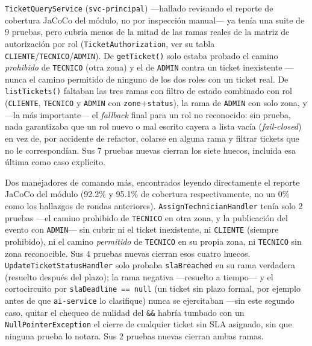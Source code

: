 \texttt{TicketQueryService} (\texttt{svc-principal}) —hallado revisando el reporte de cobertura
JaCoCo del módulo, no por inspección manual— ya tenía una suite de 9 pruebas, pero cubría menos
de la mitad de las ramas reales de la matriz de autorización por rol
(\texttt{TicketAuthorization}, ver su tabla \texttt{CLIENTE}/\texttt{TECNICO}/\texttt{ADMIN}).
De \texttt{getTicket()} solo estaba probado el camino \emph{prohibido} de \texttt{TECNICO} (otra
zona) y el de \texttt{ADMIN} contra un ticket inexistente —nunca el camino permitido de ninguno
de los dos roles con un ticket real. De \texttt{listTickets()} faltaban las tres ramas con filtro
de estado combinado con rol (\texttt{CLIENTE}, \texttt{TECNICO} y \texttt{ADMIN} con
\texttt{zone}+\texttt{status}), la rama de \texttt{ADMIN} con solo zona, y —la más importante— el
\emph{fallback} final para un rol no reconocido: sin prueba, nada garantizaba que un rol nuevo o
mal escrito cayera a lista vacía (\emph{fail-closed}) en vez de, por accidente de refactor,
colarse en alguna rama y filtrar tickets que no le correspondían. Sus 7 pruebas nuevas cierran
los siete huecos, incluida esa última como caso explícito.

Dos manejadores de comando más, encontrados leyendo directamente el reporte JaCoCo del módulo
(92.2\% y 95.1\% de cobertura respectivamente, no un 0\% como los hallazgos de rondas
anteriores). \texttt{AssignTechnicianHandler} tenía solo 2 pruebas —el camino prohibido de
\texttt{TECNICO} en otra zona, y la publicación del evento con \texttt{ADMIN}— sin cubrir ni el
ticket inexistente, ni \texttt{CLIENTE} (siempre prohibido), ni el camino \emph{permitido} de
\texttt{TECNICO} en su propia zona, ni \texttt{TECNICO} sin zona reconocible. Sus 4 pruebas
nuevas cierran esos cuatro huecos. \texttt{UpdateTicketStatusHandler} solo probaba
\texttt{slaBreached} en su rama verdadera (resuelto después del plazo); la rama negativa
—resuelto a tiempo— y el cortocircuito por \texttt{slaDeadline == null} (un ticket sin plazo
formal, por ejemplo antes de que \texttt{ai-service} lo clasifique) nunca se ejercitaban —sin
este segundo caso, quitar el chequeo de nulidad del \texttt{\&\&} habría tumbado con un
\texttt{NullPointerException} el cierre de cualquier ticket sin SLA asignado, sin que ninguna
prueba lo notara. Sus 2 pruebas nuevas cierran ambas ramas.

